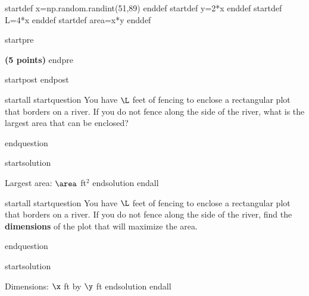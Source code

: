 startdef x=np.random.randint(51,89) enddef
startdef y=2*x enddef
startdef L=4*x enddef
startdef area=x*y enddef

startpre \item {\bf (5 points)} endpre

startpost  
\vfill \vfill \vfill
endpost



startall 
startquestion You have $\L$ feet of fencing to enclose a rectangular plot that borders on a river. If you do not fence along the side of the river, what is the largest area that can be enclosed? \\

endquestion 

startsolution 
\item  Largest area: $\area$ ft$^2$
endsolution 
endall


startall 
startquestion You have $\L$ feet of fencing to enclose a rectangular plot that borders on a river. If you do not fence along the side of the river, find the \textbf{dimensions} of the plot that will maximize the area. \\

endquestion 

startsolution 
\item  Dimensions: $\x$ ft by $\y$ ft
endsolution 
endall


